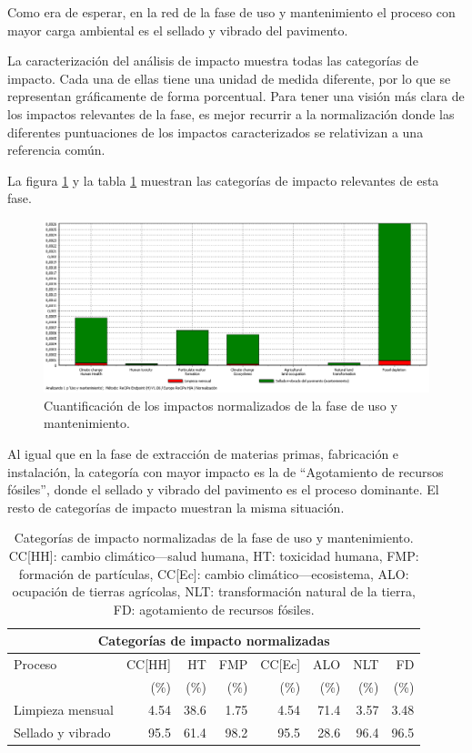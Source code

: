 Como era de esperar, en la red de la fase de uso y mantenimiento el proceso con mayor carga ambiental es el sellado y vibrado del pavimento.

La caracterización del análisis de impacto muestra todas las categorías de impacto. Cada una de ellas tiene una unidad de medida diferente, por lo que se representan gráficamente de forma porcentual. Para tener una visión más clara de los impactos relevantes de la fase, es mejor recurrir a la normalización donde las diferentes puntuaciones de los impactos caracterizados se relativizan a una referencia común.

La figura \ref{fig:uso_normalizacion} y la tabla \ref{categoriasimpactouso} muestran las categorías de impacto relevantes de esta fase.

\begin{figure}[!htb]
\centering
\includegraphics[width=15cm]{img/uso_normalizacion.png}
\caption{Cuantificación de los impactos normalizados de la fase de uso y mantenimiento.}
\label{fig:uso_normalizacion}
\end{figure}

Al igual que en la fase de extracción de materias primas, fabricación e instalación, la categoría con mayor impacto es la de ``Agotamiento de recursos fósiles'', donde el sellado y vibrado del pavimento es el proceso dominante. El resto de categorías de impacto muestran la misma situación.

\begin{table}[!htb]
\centering
\begin{tabular}{p{4cm}rrrrrrr}
\toprule
\multicolumn{8}{c}{Categorías de impacto normalizadas}\\
\midrule
Proceso & CC[HH] & HT & FMP & CC[Ec] & ALO & NLT & FD\\
 &  (\%) & (\%) & (\%) & (\%) & (\%) & (\%) & (\%)\\
\midrule
Limpieza mensual & 4.54 & 38.6 & 1.75 & 4.54 & 71.4 & 3.57 & 3.48\\
Sellado y vibrado & 95.5 & 61.4 & 98.2 & 95.5 & 28.6 & 96.4 & 96.5\\
\bottomrule
\end{tabular}
\caption[Categorías de impacto normalizadas de la fase de uso y mantenimiento.]{Categorías de impacto normalizadas de la fase de uso y mantenimiento. CC[HH]: cambio climático—salud humana, HT: toxicidad humana, FMP: formación de partículas, CC[Ec]: cambio climático—ecosistema, ALO: ocupación de tierras agrícolas, NLT: transformación natural de la tierra, FD: agotamiento de recursos fósiles.}
\label{categoriasimpactouso}
\end{table}

